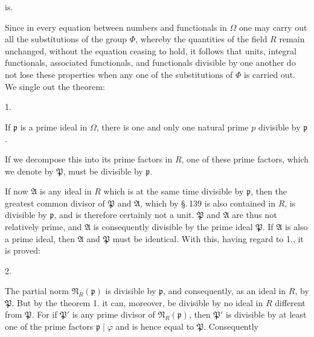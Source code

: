 is. 

Since in every equation between numbers and functionals in $\Omega$ one may carry out all
the substitutions of the group $\Phi$, whereby the quantities of the field $R$
remain unchanged, without the equation ceasing to hold, it follows that
units, integral functionals, associated functionals, and functionals divisible by one
another do not lose these properties when any one of the substitutions of
$\Phi$ is carried out. We single out the theorem:

1.  %

If $\mathfrak{p}$ is a prime ideal in $\Omega$, there is one and only one natural prime
$p$ divisible by $\mathfrak{p}$.

If we decompose this into its prime factors in $R$, one of these prime factors, which
we denote by $\mathfrak{P}$, must be divisible by $\mathfrak{p}$.

If now $\mathfrak{A}$ is any ideal in $R$ which is at the same time divisible by $\mathfrak{p}$,
then the greatest common divisor of $\mathfrak{P}$ and
$\mathfrak{A}$, which by \S.\,139 is also contained in $R$, is divisible by $\mathfrak{p}$,
and is therefore certainly not a unit. $\mathfrak{P}$ and $\mathfrak{A}$ are thus
not relatively prime, and $\mathfrak{A}$ is consequently divisible by the prime ideal $\mathfrak{P}$.
If $\mathfrak{A}$ is also a prime ideal, then $\mathfrak{A}$ and
$\mathfrak{P}$ must be identical. With this, having regard to 1., it is proved:

2. 

The partial norm $\mathfrak{N}_R(\mathfrak{p})$ is divisible by $\mathfrak{p}$, and consequently, as
an ideal in $R$, by $\mathfrak{P}$. But by the theorem 1. it can, moreover, be
divisible by no ideal in $R$ different from $\mathfrak{P}$. For if $\mathfrak{P}'$
is any prime divisor of $\mathfrak{N}_R(\mathfrak{p})$, then $\mathfrak{P}'$ is divisible by
at least one of the prime factors $\mathfrak{p} \mid \varphi$ and is hence equal to $\mathfrak{P}$. Consequently
